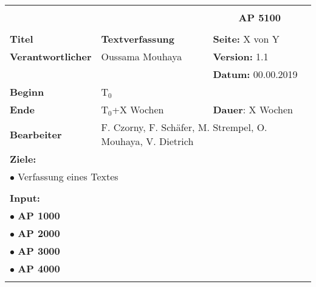 \begin{table}[!h]
 \begin{center}
  \begin{tabular}{|p{35mm}||p{55mm}|p{50mm}||p{40mm}|}
   \hline
   \multicolumn{3}{|l||}{\textbf{}} & \multicolumn{1}{c|}{}\\
   \multicolumn{3}{|l||}{\textbf{}} & \multicolumn{1}{c|}{\textbf{AP 5100}}\\
   \multicolumn{3}{|l||}{\textbf{}} & \multicolumn{1}{c|}{}\\
   \hline\hline
   \textbf{Titel} & \multicolumn{2}{p{7cm}||}{\textbf{Textverfassung}} & \textbf{Seite:} X von Y\\
   \hline
   \textbf{Verantwortlicher} & \multicolumn{2}{l||}{Oussama Mouhaya} & \textbf{Version:} 1.1\\
   \hline
   \multicolumn{3}{|l||}{} & \textbf{Datum:} 00.00.2019\\
   \hline\hline
   \textbf{Beginn} & \multicolumn{2}{l||}{T$_0$} & \\
   \hline
   \textbf{Ende} & \multicolumn{2}{l||}{T$_0$+X Wochen} & \textbf{Dauer}: X Wochen\\
   \hline\hline
   \textbf{Bearbeiter} & \multicolumn{3}{l|}{F. Czorny, F. Schäfer, M. Strempel, O. Mouhaya, V. Dietrich}\\
   \hline\hline
   \multicolumn{4}{|p{150mm}|}{\textbf{Ziele:}}\\
   \multicolumn{4}{|p{150mm}|}{$\bullet$ Verfassung eines Textes}\\
   \multicolumn{4}{|p{150mm}|}{}\\
   \multicolumn{4}{|p{150mm}|}{\textbf{Input:}}\\
   \multicolumn{4}{|p{150mm}|}{$\bullet$ \textbf{AP 1000}}\\
   \multicolumn{4}{|p{150mm}|}{$\bullet$ \textbf{AP 2000}}\\
	 \multicolumn{4}{|p{150mm}|}{$\bullet$ \textbf{AP 3000}}\\
	 \multicolumn{4}{|p{150mm}|}{$\bullet$ \textbf{AP 4000}}\\
   \multicolumn{4}{|p{150mm}|}{}\\

\end{tabular}
\end{center}
\end{table}
